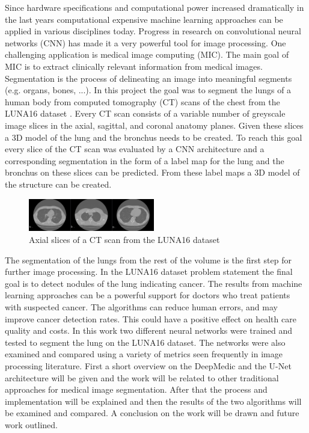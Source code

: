 
Since hardware specifications and computational power increased dramatically in the last years computational expensive machine learning approaches can be applied in various disciplines today. Progress in research on convolutional neural networks (CNN) has made it a very powerful tool for image processing.\newline
One challenging application is medical image computing (MIC). The main goal of MIC is to extract clinically relevant information from medical images. Segmentation is the process of delineating an image into meaningful segments (e.g. organs, bones, ...).\newline
In this project the goal was to segment the lungs of a human body from computed tomography (CT) scans of the chest from the LUNA16 dataset \cite{luna}. Every CT scan consists of a variable number of greyscale image slices in the axial, sagittal, and coronal anatomy planes. Given these slices a 3D model of the lung and the bronchus needs to be created. To reach this goal every slice of the CT scan was evaluated by a CNN architecture and a corresponding segmentation in the form of a label map for the lung and the bronchus on these slices can be predicted. From these label maps a 3D model of the structure can be created. \newline

\begin{figure}[h!]
	\includegraphics[width=0.49\textwidth, angle=0]{files/ctscans.jpg}
	\caption{Axial slices of a CT scan from the LUNA16 dataset}
	\label{scan_picture}
\end{figure}

The segmentation of the lungs from the rest of the volume is the first step for further image processing. In the LUNA16 dataset problem statement the final goal is to detect nodules of the lung indicating cancer. The results from machine learning approaches can be a powerful support for doctors who treat patients with suspected cancer. The algorithms can reduce human errors, and may improve cancer detection rates. This could have a positive effect on health care quality and costs.\newline
In this work two different neural networks were trained and tested to segment the lung on the LUNA16 dataset. The networks were also examined and compared using a variety of metrics seen frequently in image processing literature.\newline
First a short overview on the DeepMedic and the U-Net architecture will be given and the work will be related to other traditional approaches for medical image segmentation. After that the process and implementation will be explained and then the results of the two algorithms will be examined and compared. A conclusion on the work will be drawn and future work outlined.
